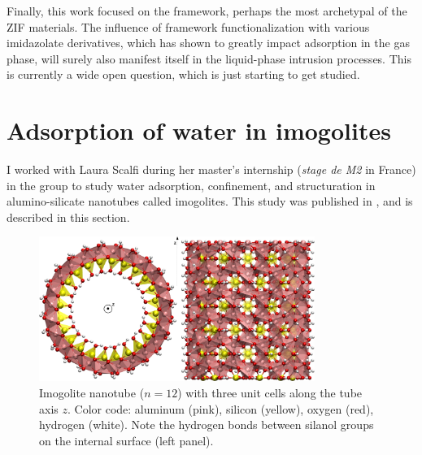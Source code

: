 \documentclass[thesis]{subfiles}
\begin{document}
Finally, this work focused on the  framework, perhaps the most archetypal
of the ZIF materials. The influence of framework functionalization with various
imidazolate derivatives, which has shown to greatly impact adsorption in the gas
phase, will surely also manifest itself in the liquid-phase intrusion processes.
This is currently a wide open question, which is just starting to get
studied\cite{Mortada2018}.

\newpage
\section{Adsorption of water in imogolites}

I worked with Laura Scalfi during her master's internship (\emph{stage de M2} in
France) in the group to study water adsorption, confinement, and structuration
in alumino-silicate nanotubes called imogolites. This study was published in
\cite{Scalfi2018}, and is described in this section.

\begin{figure}[h]
    \centering
    \includegraphics[width=0.8\textwidth]{figures/images/imogolite}
    \caption{Imogolite nanotube ($n=12$) with three unit cells along the tube
    axis $z$. Color code: aluminum (pink), silicon (yellow), oxygen (red),
    hydrogen (white). Note the hydrogen bonds between silanol groups on the
    internal surface (left panel).}
    \label{fig:imogolite:structure}
\end{figure}
\end{document}
